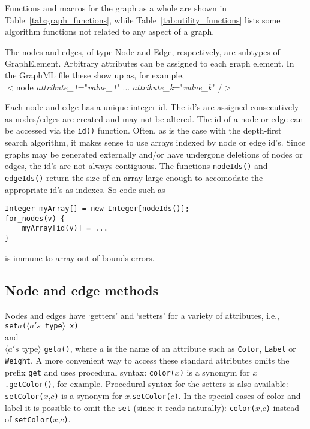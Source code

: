 



Functions and macros for the graph as a whole are shown in Table~\ref{tab:graph_functions}, while Table~\ref{tab:utility_functions} lists some algorithm functions not related to any aspect of a graph.

The nodes and edges, of type \textsf{Node} and \textsf{Edge}, respectively,
are subtypes of \textsf{GraphElement}.
Arbitrary attributes can be assigned to each graph element. In the GraphML file
these show up as, for example,\\
\hspace*{3em}
\textsf{
$<$node \emph{attribute\_1}="\emph{value\_1}" ... \emph{attribute\_k}="\emph{value\_k}" /$>$
}

Each node and edge has a unique integer id.
The id's are assigned consecutively as nodes/edges are created
and may not be altered.
The id of a node or edge can be accessed via the \texttt{id()} function.
Often, as is the case with the depth-first search algorithm, it makes sense to use
arrays indexed by node or edge id's.
Since graphs may be generated externally and/or have undergone deletions of nodes or
edges, the id's are not always contiguous.
The functions \texttt{nodeIds()} and \texttt{edgeIds()} return the size of an array
large enough to accomodate the appropriate id's as indexes. So code such as
\begin{verbatim}
Integer myArray[] = new Integer[nodeIds()];
for_nodes(v) {
    myArray[id(v)] = ...
}
\end{verbatim}
is immune to array out of bounds errors.

\subsection{Node and edge methods}

Nodes and edges have `getters' and `setters' for
a variety of attributes, i.e.,
\\
\texttt{set}$a$\texttt{($\langle a's$ type$\rangle$ x)}
\\
and
\\
$\langle a's$ type$\rangle$ \texttt{get}$a$\texttt{()},
where $a$ is the name of an attribute such as
\texttt{Color},
\texttt{Label} or \texttt{Weight}.
A more convenient way to access these standard attributes omits the prefix \texttt{get}
and uses procedural syntax:
\texttt{color(}$x$\texttt{)} is a synomym for $x$\texttt{.getColor()}, for example.
Procedural syntax for the setters is also available:
\texttt{setColor(}$x$,$c$\texttt{)} is a synonym for $x$.\texttt{setColor(}$c$\texttt{)}.
In the special cases of color and label it is possible to omit the \texttt{set}
(since it reads naturally): \texttt{color(}$x$,$c$\texttt{)} instead of \texttt{setColor(}$x$,$c$\texttt{)}.

